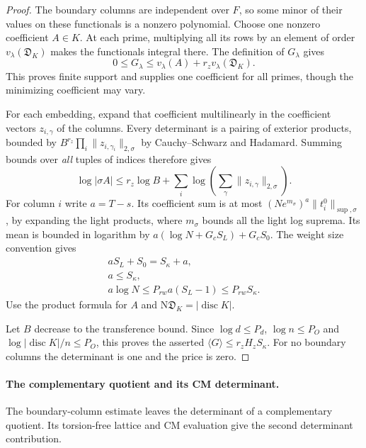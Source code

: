 \begin{proof}
The boundary columns are independent over \(F\), so some
minor of their values on these functionals is a nonzero
polynomial. Choose one nonzero coefficient \(A\in K\).
At each prime, multiplying all its rows by an element of
order \(v_\lambda(\mathfrak D_K)\) makes the functionals
integral there. The definition of \(G_\lambda\) gives
\[
 0\le G_\lambda\le v_\lambda(A)+r_z v_\lambda(\mathfrak D_K).
\]
This proves finite support and supplies one coefficient for
all primes, though the minimizing coefficient may vary.

For each embedding, expand that coefficient multilinearly
in the coefficient vectors \(z_{i,\gamma}\) of the columns.
Every determinant is a pairing of exterior products, bounded
by \(B^{r_z}\prod_i\|z_{i,\gamma_i}\|_{2,\sigma}\)
by Cauchy--Schwarz and Hadamard. Summing bounds over
\emph{all} tuples of indices therefore gives
\[
 \log |\sigma A|\le r_z\log B+
       \sum_i\log\left(\sum_\gamma\|z_{i,\gamma}\|_{2,\sigma}\right).
\]
For column \(i\) write \(a=T-s\). Its coefficient sum is
at most \((N e^{m_\sigma})^a\|t_i^0\|_{\sup,\sigma}\),
by expanding the light products, where \(m_\sigma\) bounds
all the light log suprema. Its mean is bounded in logarithm
by \(a(\log N+G_c S_L)+G_c S_0\). The weight size convention
gives \[
 \begin{gathered}
 aS_L+S_0=S_\kappa+a, \\ a\le S_\kappa, \\ a\log N\le P_{rw}a(S_L-1)\le P_{rw}S_\kappa.
\end{gathered}
\]
Use the product formula for \(A\) and
\(\mathrm N\mathfrak D_K=|\operatorname{disc}K|\).

Let \(B\) decrease to the transference bound. Since
\(\log d\le P_d\), \(\log n\le P_O\) and
\(\log|\operatorname{disc}K|/n\le P_O\), this proves
the asserted \(\langle G\rangle\le r_z H_z S_\kappa\).
For no boundary columns the determinant is one and the price
is zero.

\end{proof}

\paragraph{The complementary quotient and its CM determinant.}

The boundary-column estimate leaves the determinant of a complementary quotient. Its torsion-free lattice and CM evaluation give the second determinant contribution.

